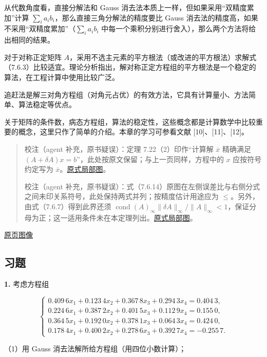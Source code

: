 \documentclass[
  10pt,
  fontset=fandol]{ctexart}
\begin{document}
从代数角度看，直接分解法和 Gauss 消去法本质上一样，但如果采用``双精度累加''计算 \(\sum_i a_ib_i\)，那么直接三角分解法的精度要比 Gauss 消去法的精度高，如果不采用``双精度累加''（\(\sum_i a_ib_i\) 中每一个乘积分别进行舍入），那么两个方法将给出相同的结果。

对于对称正定矩阵 \(A\)，采用不选主元素的平方根法（或改进的平方根法）求解式（7.6.3）比较适宜。理论分析指出，解对称正定方程组的平方根法是一个稳定的算法，在工程计算中使用比较广泛。

追赶法是解三对角方程组（对角元占优）的有效方法，它具有计算量小、方法简单、算法稳定等优点。

关于矩阵的条件数，病态方程组，算法的稳定性，这些概念都是计算数学中比较重要的概念，这里只作了简单的介绍。本章的学习可参看文献 {[}10{]}、{[}11{]}、{[}12{]}。

\begin{quote}
校注（agent 补充，原书疑误）：定理 7.22（2）印作``计算解 \(\overline x\) 精确满足 \((A+\delta A)x=b\)''，此处按原文保留；与上一页同样，方程中的 \(x\) 应按符号约定写为 \(\overline x\)。\href{../assets/ch07b/211-computed-solution.png}{原式局部图}。

校注（agent 补充，原书疑误）：式（7.6.14）原图在左侧误差比与右侧分式之间未印关系符号，此处保持两式并列；按精度估计用途应为 \(\leqslant\)。另外，由式（7.6.7）得到此界还须 \(\operatorname{cond}(A)_\infty\|\delta A\|_\infty/\|A\|_\infty<1\)，保证分母为正；这一适用条件未在本定理列出。\href{../assets/ch07b/211-error-estimate.png}{原式局部图}。
\end{quote}

\href{../../source-images/pdf-212.jpeg}{原页图像}

\subsection{习题}\label{ux4e60ux9898}

\textbf{1.} 考虑方程组

\[
\begin{cases}
0.409\,6x_1+0.123\,4x_2+0.367\,8x_3+0.294\,3x_4=0.404\,3,\\
0.224\,6x_1+0.387\,2x_2+0.401\,5x_3+0.112\,9x_4=0.155\,0,\\
0.364\,5x_1+0.192\,0x_2+0.378\,1x_3+0.064\,3x_4=0.424\,0,\\
0.178\,4x_1+0.400\,2x_2+0.278\,6x_3+0.392\,7x_4=-0.255\,7.
\end{cases}
\]

（1）用 Gauss 消去法解所给方程组（用四位小数计算）；
\end{document}
